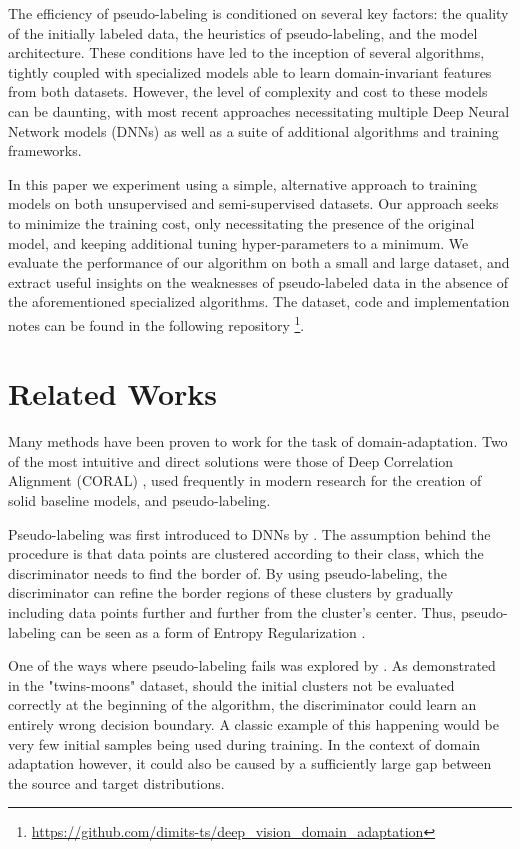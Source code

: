 \documentclass[12pt, a4paper]{article}
\begin{document}
	The efficiency of pseudo-labeling is conditioned on several key factors: the quality of the initially labeled data, the heuristics of pseudo-labeling, and the model architecture. These conditions have led to the inception of several algorithms, tightly coupled with specialized models able to learn domain-invariant features from both datasets. However, the level of complexity and cost to these models can be daunting, with most recent approaches necessitating multiple Deep Neural Network models (DNNs) as well as a suite of additional algorithms and training frameworks. 
	
	In this paper we experiment using a simple, alternative approach to training models on both unsupervised and semi-supervised datasets. Our approach seeks to minimize the training cost, only necessitating the presence of the original model, and keeping additional tuning hyper-parameters to a minimum. We evaluate the performance of our algorithm on both a small and large dataset, and extract useful insights on the weaknesses of pseudo-labeled data in the absence of the aforementioned specialized algorithms. The dataset, code and implementation notes can be found in the following repository \footnote{\url{https://github.com/dimits-ts/deep\_vision\_domain\_adaptation}}.
	
	
	\section{Related Works}
	
	Many methods have been proven to work for the task of domain-adaptation. Two of the most intuitive and direct solutions were those of Deep Correlation Alignment (CORAL) \parencite{coral}, used frequently in modern research for the creation of solid baseline models, and pseudo-labeling.
	
	Pseudo-labeling was first introduced to DNNs by \cite{pseudo-label-original}. The assumption behind the procedure is that data points are clustered according to their class, which the discriminator needs to find the border of. By using pseudo-labeling, the discriminator can refine the border regions of these clusters by gradually including data points further and further from the cluster's center. Thus, pseudo-labeling can be seen as a form of Entropy Regularization \parencite{entropy-regularization}.
	
	One of the ways where pseudo-labeling fails was explored by \cite{pseudo-label-evaluation}. As demonstrated in the "twins-moons" dataset, should the initial clusters not be evaluated correctly at the beginning of the algorithm, the discriminator could learn an entirely wrong decision boundary. A classic example of this happening would be very few initial samples being used during training. In the context of domain adaptation however, it could also be caused by a sufficiently large gap between the source and target distributions.
	
\end{document}
